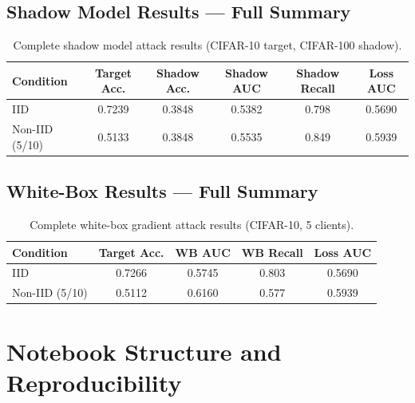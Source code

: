 \documentclass[12pt, a4paper]{report}
\begin{document}
\section{Shadow Model Results --- Full Summary}
\begin{table}[H]
  \centering
  \caption{Complete shadow model attack results (CIFAR-10 target, CIFAR-100 shadow).}
  \begin{tabular}{lccccc}
    \toprule
    \textbf{Condition} & \textbf{Target Acc.} & \textbf{Shadow Acc.} & \textbf{Shadow AUC} & \textbf{Shadow Recall} & \textbf{Loss AUC} \\
    \midrule
    IID             & 0.7239 & 0.3848 & 0.5382 & 0.798 & 0.5690 \\
    Non-IID (5/10)  & 0.5133 & 0.3848 & 0.5535 & 0.849 & 0.5939 \\
    \midrule
    \bottomrule
  \end{tabular}
\end{table}

\section{White-Box Results --- Full Summary}
\begin{table}[H]
  \centering
  \caption{Complete white-box gradient attack results (CIFAR-10, 5 clients).}
  \begin{tabular}{lcccc}
    \toprule
    \textbf{Condition} & \textbf{Target Acc.} & \textbf{WB AUC} & \textbf{WB Recall} & \textbf{Loss AUC} \\
    \midrule
    IID             & 0.7266 & 0.5745 & 0.803 & 0.5690 \\
    Non-IID (5/10)  & 0.5112 & 0.6160 & 0.577 & 0.5939 \\
    \bottomrule
  \end{tabular}
\end{table}

\chapter{Notebook Structure and Reproducibility}
\label{app:notebooks}
\end{document}
